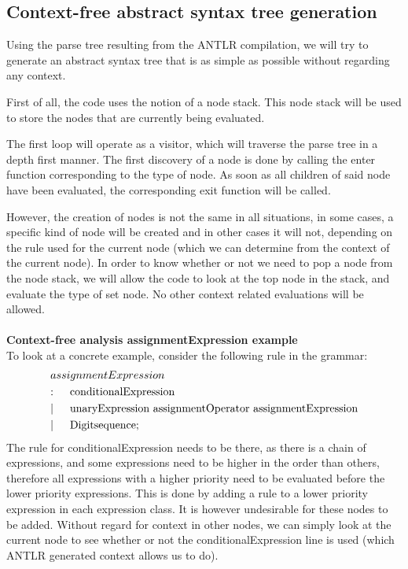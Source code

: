 \documentclass[12pt]{article}
\begin{document}
\subsection{Context-free abstract syntax tree generation}
Using the parse tree resulting from the ANTLR compilation, we will try to generate an abstract syntax tree that is as simple as possible without regarding any context. 

First of all, the code uses the notion of a node stack. This node stack will be used to store the nodes that are currently being evaluated.

The first loop will operate as a visitor, which will traverse the parse tree in a depth first manner. The first discovery of a node is done by calling the enter function corresponding to the type of node. As soon as all children of said node have been evaluated, the corresponding exit function will be called. 

However, the creation of nodes is not the same in all situations, in some cases, a specific kind of node will be created and in other cases it will not, depending on the rule used for the current node (which we can determine from the context of the current node). In order to know whether or not we need to pop a node from the node stack, we will allow the code to look at the top node in the stack, and evaluate the type of set node. No other context related evaluations will be allowed.\\
\\
\noindent
\textbf{Context-free analysis assignmentExpression example}\\
To look at a concrete example, consider the following rule in the grammar:
\begin{align*}
	&assignmentExpression\\
	&\text{:}\indent \text{conditionalExpression}\\
	&|\indent \text{unaryExpression assignmentOperator assignmentExpression}\\
	&|\indent \text{Digitsequence}; \\
\end{align*}
The rule for conditionalExpression needs to be there, as there is a chain of expressions, and some expressions need to be higher in the order than others, therefore all expressions with a higher priority need to be evaluated before the lower priority expressions. This is done by adding a rule to a lower priority expression in each expression class. It is however undesirable for these nodes to be added. Without regard for context in other nodes, we can simply look at the current node to see whether or not the conditionalExpression line is used (which ANTLR generated context allows us to do).
\end{document}
